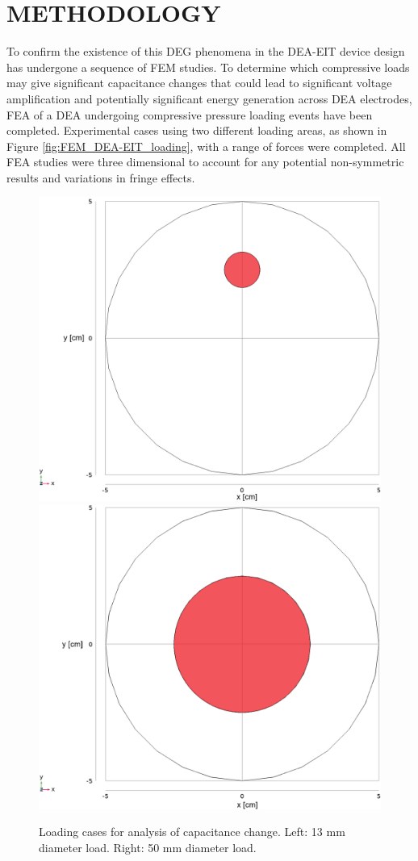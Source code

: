 \section{METHODOLOGY} %
\label{sec:method}
To confirm the existence of this DEG phenomena in the DEA-EIT device design has undergone a sequence of FEM studies. To determine which compressive loads may give significant capacitance changes that could lead to significant voltage amplification and potentially significant energy generation across DEA electrodes, FEA of a DEA undergoing compressive pressure loading events have been completed. Experimental cases using two different loading areas, as shown in Figure \ref{fig:FEM_DEA-EIT_loading}, with a range of forces were completed. All FEA studies were three dimensional to account for any potential non-symmetric results and variations in fringe effects.
\begin{figure}[H]
	\centering
	\includegraphics[width=0.45\linewidth]{Figures/d13mm_load_case_comsol2d_red.png} %
	\includegraphics[width=0.45\linewidth]{Figures/d50mm_load_case_comsol2d_red.png} %
	\vspace{0.3cm}
	\caption{Loading cases for analysis of capacitance change. Left: 13 mm diameter load. Right: 50 mm diameter load.}
	\label{fig:DEA-EIT_loading}
\end{figure}



